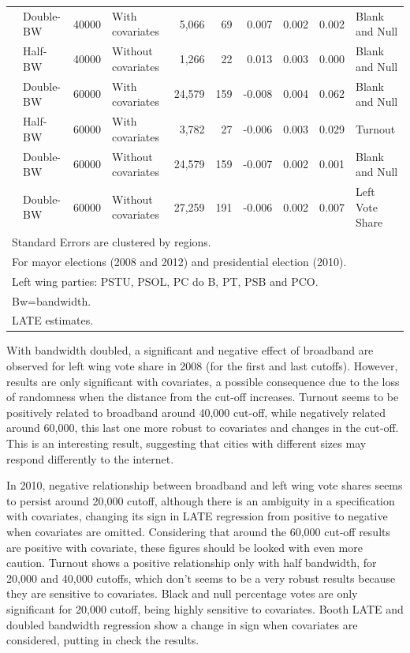 \documentclass[
  12pt,
]{article}
\begin{document}
\begin{landscape}
\begin{table}[!h]
\begin{tabular}[t]{llllrrrrrl}
 & Double-BW & 40000 & With covariates & 5,066 & 69 & 0.007 & 0.002 & 0.002 & Blank and Null\\

 & Half-BW & 40000 & Without covariates & 1,266 & 22 & 0.013 & 0.003 & 0.000 & Blank and Null\\

 & Double-BW & 60000 & With covariates & 24,579 & 159 & -0.008 & 0.004 & 0.062 & Blank and Null\\

 & Half-BW & 60000 & With covariates & 3,782 & 27 & -0.006 & 0.003 & 0.029 & Turnout\\

 & Double-BW & 60000 & Without covariates & 24,579 & 159 & -0.007 & 0.002 & 0.001 & Blank and Null\\

\multirow{-11}{*}{\raggedright\arraybackslash 2012} & Double-BW & 60000 & Without covariates & 27,259 & 191 & -0.006 & 0.002 & 0.007 & Left Vote Share\\
\bottomrule
\multicolumn{10}{l}{Standard Errors are clustered by regions.}\\
\multicolumn{10}{l}{For mayor elections (2008 and 2012) and presidential election (2010).}\\
\multicolumn{10}{l}{Left wing parties: PSTU, PSOL, PC do B, PT, PSB and PCO.}\\
\multicolumn{10}{l}{Bw=bandwidth.}\\
\multicolumn{10}{l}{LATE estimates.}\\
\end{tabular}
\end{table}
\end{landscape}

With bandwidth doubled, a significant and negative effect of broadband
are observed for left wing vote share in 2008 (for the first and last
cutoffs). However, results are only significant with covariates, a
possible consequence due to the loss of randomness when the distance
from the cut-off increases. Turnout seems to be positively related to
broadband around 40,000 cut-off, while negatively related around 60,000,
this last one more robust to covariates and changes in the cut-off. This
is an interesting result, suggesting that cities with different sizes
may respond differently to the internet.

In 2010, negative relationship between broadband and left wing vote
shares seems to persist around 20,000 cutoff, although there is an
ambiguity in a specification with covariates, changing its sign in LATE
regression from positive to negative when covariates are omitted.
Considering that around the 60,000 cut-off results are positive with
covariate, these figures should be looked with even more caution.
Turnout shows a positive relationship only with half bandwidth, for
20,000 and 40,000 cutoffs, which don't seems to be a very robust results
because they are sensitive to covariates. Black and null percentage
votes are only significant for 20,000 cutoff, being highly sensitive to
covariates. Booth LATE and doubled bandwidth regression show a change in
sign when covariates are considered, putting in check the results.
\end{document}
